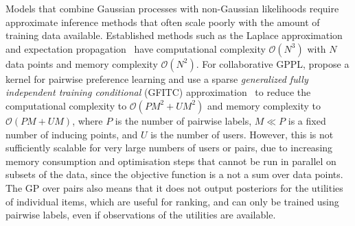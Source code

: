 Models that combine Gaussian processes with non-Gaussian likelihoods 
require approximate inference methods that often scale poorly with 
the amount of training data available. 
Established methods such as the Laplace approximation 
and expectation propagation~\citep{rasmussen_gaussian_2006} have
computational complexity $\mathcal{O}(N^3)$ with $N$ data points
 and memory complexity $\mathcal{O}(N^2)$. 
For collaborative GPPL, \citet{houlsby2012collaborative}
propose a  kernel for pairwise 
preference learning and use a sparse
\emph{generalized fully independent training conditional} (GFITC) 
approximation~\citep{snelson2006sparse} to reduce the computational complexity to $\mathcal{O}(PM^2 + UM^2)$ and 
memory complexity to $\mathcal{O}(PM + UM)$,
where $P$ is the number of pairwise labels, 
$M \ll P$ is a fixed number of inducing points, 
and $U$ is the number of users.
However, this is not sufficiently scalable
for very large numbers of users or pairs, 
due to increasing memory consumption 
and optimisation steps that cannot be run in parallel on subsets of the data, 
since the objective function is a not a sum over data points.
The GP over pairs also means that it does not output posteriors for 
the utilities of individual items, which are useful for ranking,
and can only be trained using pairwise labels, even if observations of the utilities
are available.

